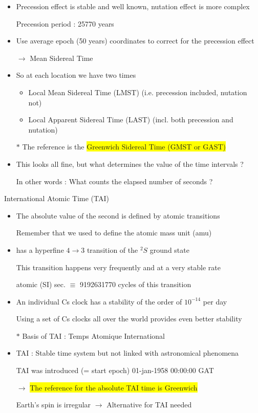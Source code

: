 \Tr
\begin{itemize}
\item Precession effect is stable and well known, nutation effect is more complex
\item[] Precession period : 25770 years
\item Use average epoch (50 years) coordinates to correct for the precession effect
\item[] $\rightarrow$ {\blue Mean Sidereal Time}
\item So at each location we have two times
\begin{itemize}
\item {\blue Local Mean Sidereal Time (LMST)} (i.e. precession included, nutation not)
\item {\blue Local Apparent Sidereal Time (LAST)} (incl. both precession and nutation)
\end{itemize}
\item[$\ast$] The reference is the \colorbox{yellow}{Greenwich Sidereal Time (GMST or GAST)} 
\item This looks all fine, but what determines the value of the time intervals ?
\item[] In other words : {\blue What counts the elapsed number of seconds ?}
\end{itemize}

\Tr
\begin{center}
{\red International Atomic Time (TAI)}
\end{center}
%
\begin{itemize}
\item The absolute value of the second is defined by atomic transitions
\item[] Remember that we used  to define the atomic mass unit (amu)
\item {} has a hyperfine $4 \rightarrow 3$ transition of the $^{2}S$ ground state
\item[] This transition happens very frequently and at a very stable rate
\item[] { atomic (SI) sec. $\equiv$ 9192631770 cycles of this  transition}
\item An individual Cs clock has a stability of the order of $10^{-14}$ per day
\item[] Using a set of Cs clocks all over the world provides even better stability 
\item[$\ast$] Basis of {\blue TAI : Temps Atomique International}
\item TAI : Stable time system but not linked with astronomical phenomena
\item[] TAI was introduced (= start epoch) 01-jan-1958 00:00:00 GAT
\item[] $\rightarrow$ \colorbox{yellow}{The reference for the absolute TAI time is Greenwich}
\item[] Earth's spin is irregular $\rightarrow$ Alternative for TAI needed
\end{itemize}

